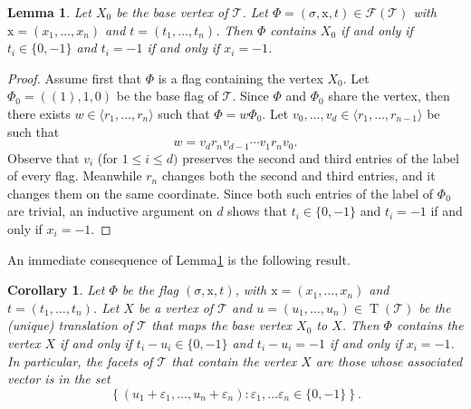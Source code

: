 \documentclass[final]{amsart}
\theoremstyle{plain}
\newtheorem{lem}[thm]{Lemma}
\newtheorem{coro}[thm]{Corollary}
\theoremstyle{definition}
\theoremstyle{remark}
\numberwithin{equation}{section}
\renewcommand{\leq}{\leqslant} \renewcommand{\geq}{\geqslant}
\renewcommand{\epsilon}{\varepsilon} \renewcommand{\subset}{\subseteq} \renewcommand{\supset}{\supseteq} \renewcommand{\subsetneq}{\varsubsetneq}
\renewcommand{\{}{\lbrace}
\renewcommand{\}}{\rbrace}
\newcommand{\cF}{\mathcal{F}}
\newcommand{\cT}{\mathcal{T}}
\newcommand{\cyvec}[1]{{\mathrm{#1}}}
\newcommand{\vx}{\cyvec{x}}
\DeclareMathOperator{\tras}{T}
\begin{document}
\begin{lem}\label{lem:flagsAroundX0} 
  Let $X_{0}$ be the base vertex of $\cT$. 
  Let $\Phi = (\sigma, \vx, t) \in  \cF(\cT)$ with $\vx=(x_{1}, \dots, x_{n})$ and $t= (t_{1}, \dots, t_{n})$. 
  Then $\Phi$ contains $X_{0}$ if and only if $t_i \in \{0,-1\} $ and $t_i = -1$ if and only if $x_i = -1$.
\end{lem}
  \begin{proof}
    Assume first that $\Phi$ is a flag containing the vertex $X_0$.
    Let $\Phi_0 = ( (1), \cyvec{1},0)$ be the base flag of $\cT$. 
    Since  $\Phi$ and $\Phi_0$ share the vertex, then there exists $w \in \langle r_1, \dots, r_n \rangle$ such that $\Phi= w \Phi_0$.
    Let $v_0, \dots, v_d \in \langle r_1, \dots, r_{n-1} \rangle$ be such that \[w= v_d r_n v_{d-1} \cdots v_1 r_n v_0. \]
    Observe that $v_i$ (for $ 1 \leq i \leq d )$ preserves the second and third entries of the label of every flag. Meanwhile $r_n$ changes both the second and third entries, and it changes them on the same coordinate.
    Since both such entries of the label of $\Phi_0$ are trivial, an inductive argument on $d$ shows that $t_i \in \{0, -1\}$ and $t_i = -1$ if and only if $x_i = -1$.
  \end{proof}

An immediate consequence of Lemma\nobreakspace \ref {lem:flagsAroundX0} is the following result.

\begin{coro}
\label{coro:facetsAroundAnyVertex}
Let $\Phi$ be the flag $(\sigma, \vx, t)$, with $\vx=(x_{1}, \dots, x_{n})$ and $t= (t_{1}, \dots, t_{n})$. 
Let $X$ be a vertex of $\cT$ and $u = (u_1, \dots, u_n) \in \tras(\cT)$ be the (unique) translation of $\cT$ that maps the base vertex $X_0$ to $X$.
Then $\Phi$ contains the vertex $X$ if and only if $t_i-u_i \in \{0, -1\}$ and $t_i -u_i = -1$ if and only if $x_i=-1$.
In particular, the facets of $\cT$ that contain the vertex $X$ are those whose associated vector is in the set \[\left\{(u_1 + \epsilon_1, \dots, u_n + \epsilon_n) : \epsilon_1, \dots \epsilon_n \in \{0,-1\} \right\}.\]
\end{coro}
\end{document}
